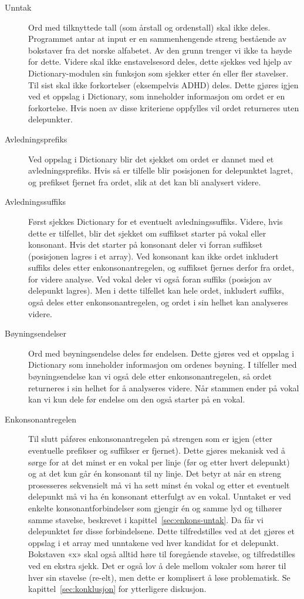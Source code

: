 \begin{description}
\item[Unntak] Ord med tilknyttede tall (som årstall og ordenstall) skal ikke deles. Programmet antar at input er en sammenhengende streng bestående av bokstaver fra det norske alfabetet. Av den grunn trenger vi ikke ta høyde for dette. Videre skal ikke enstavelsesord deles, dette sjekkes ved hjelp av Dictionary-modulen sin funksjon som sjekker etter én eller fler stavelser. Til sist skal ikke forkortelser (eksempelvis ADHD) deles. Dette gjøres igjen ved et oppslag i Dictionary, som inneholder informasjon om ordet er en forkortelse. Hvis noen av disse kriteriene oppfylles vil ordet returneres uten delepunkter.
\item[Avledningsprefiks] Ved oppslag i Dictionary blir det sjekket om ordet er dannet med et avledningsprefiks. Hvis så er tilfelle blir posisjonen for delepunktet lagret, og prefikset fjernet fra ordet, slik at det kan bli analysert videre.
\item[Avledningssuffiks] Først sjekkes Dictionary for et eventuelt avledningssuffiks. Videre, hvis dette er tilfellet, blir det sjekket om suffikset starter på vokal eller konsonant. Hvis det starter på konsonant deler vi forran suffikset (posisjonen lagres i et array). Ved konsonant kan ikke ordet inkludert suffiks deles etter enkonsonantregelen, og suffikset fjernes derfor fra ordet, for videre analyse. Ved vokal deler vi også foran suffiks (posisjon av delepunkt lagres). Men i dette tilfellet kan hele ordet, inkludert suffiks, også deles etter enkonsonantregelen, og ordet i sin helhet kan analyseres videre.
\item[Bøyningsendelser] Ord med bøyningsendelse deles før endelsen. Dette gjøres ved et oppslag i Dictionary som inneholder informasjon om ordenes bøyning. I tilfeller med bøyningsendelse kan vi også dele etter enkonsonantregelen, så ordet returneres i sin helhet for å analyseres videre. Når stammen ender på vokal kan vi kun dele før endelse om den også starter på en vokal.
\item[Enkonsonantregelen] Til slutt påføres enkonsonantregelen på strengen som er igjen (etter eventuelle prefikser og suffikser er fjernet). Dette gjøres mekanisk ved å sørge for at det minst er en vokal per linje (før og etter hvert delepunkt) og at det kun går én konsonant til ny linje. Det betyr at når en streng prosesseres sekvensielt må vi ha sett minst én vokal og etter et eventuelt delepunkt må vi ha én konsonant etterfulgt av en vokal. Unntaket er ved enkelte konsonantforbindelser som gjengir én og samme lyd og tilhører samme stavelse, beskrevet i kapittel~\ref{sec:enkons-untak}. Da får vi delepunktet før disse forbindelsene. Dette tilfredstilles ved at det gjøres et oppslag i et array med unntakene ved hver kandidat for et delepunkt. Bokstaven «x» skal også alltid høre til foregående stavelse, og tilfredstilles ved en ekstra sjekk. Det er også lov å dele mellom vokaler som hører til hver sin stavelse (re-elt), men dette er komplisert å løse problematisk. Se kapittel~\ref{sec:konklusjon} for ytterligere diskusjon.
\end{description}

